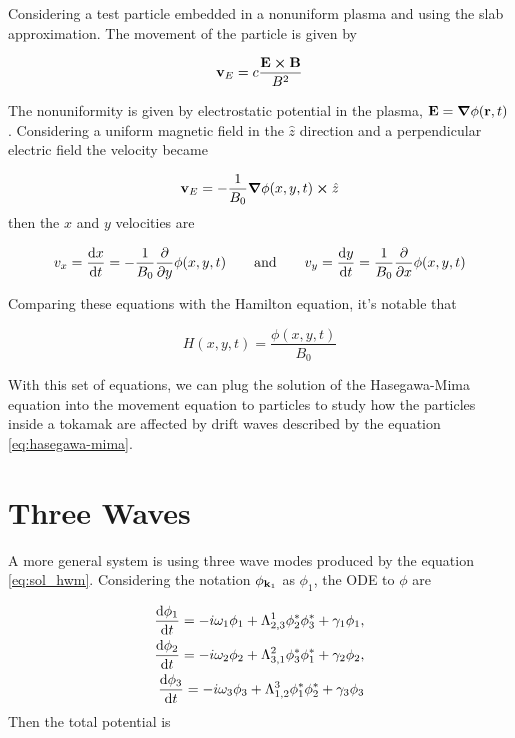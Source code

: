 \documentclass[12pt, a4paper]{article}
\begin{document}
Considering a test particle embedded in a nonuniform plasma and using the slab approximation. The movement of the particle is given by

\begin{equation}
	\vb{v}_E=c\frac{\vb{E}\cp\vb{B}}{B^2}
\end{equation}

The nonuniformity is given by electrostatic potential in the plasma,  $\vb{E}=\grad\phi(\vb{r},t)$. Considering a uniform magnetic field in the $\hat{z}$ direction and a perpendicular electric field the velocity became

\begin{equation}
 	\vb{v}_E=-\frac{1}{B_0}\grad\phi(x,y,t)\cp\hat{z}
 \end{equation} 
 then the $x$ and $y$ velocities are

 \begin{equation}
  	v_x = \dv{x}{t}=-\frac{1}{B_0}\pdv{y}\phi(x,y,t)\qquad \text{and}\qquad v_y = \dv{y}{t}=\frac{1}{B_0}\pdv{x}\phi(x,y,t)
  \end{equation} 

  Comparing these equations with the Hamilton equation, it's notable that

  \begin{equation}
  	H(x,y,t)=\frac{\phi(x,y,t)}{B_0}
  	\label{eq:Hamilton}
  \end{equation}




With this set of equations, we can plug the solution of the Hasegawa-Mima equation into the movement equation to particles to study how the particles inside a tokamak are affected by drift waves described by the equation \ref{eq:hasegawa-mima}. 

\section{Three Waves}

A more general system is using three wave modes produced by the equation \ref{eq:sol_hwm}. Considering the notation $\phi_{\vb{k}_1}$ as $\phi_1$, the ODE to $\phi$ are

\begin{align}
	\dv{\phi_{1}}{t}=-i\omega_{1}\phi_{1}+\Lambda^1_{2,3}\phi_2^*\phi_3^*+\gamma_1\phi_1,\\
	\dv{\phi_{2}}{t}=-i\omega_{2}\phi_{2}+\Lambda^2_{3,1}\phi_3^*\phi_1^*+\gamma_2\phi_2,\\
	\dv{\phi_{3}}{t}=-i\omega_{3}\phi_{3}+\Lambda^3_{1,2}\phi_1^*\phi_2^*+\gamma_3\phi_3
\end{align}
Then the total potential is
\end{document}
